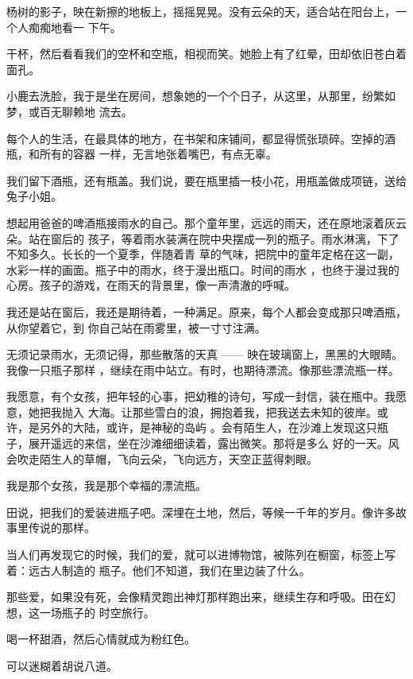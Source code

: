 \documentclass[12pt,a4paper]{article}
\begin{document}
		杨树的影子，映在新擦的地板上，摇摇晃晃。没有云朵的天，适合站在阳台上，一个人痴痴地看一
	下午。

		干杯，然后看看我们的空杯和空瓶，相视而笑。她脸上有了红晕，田却依旧苍白着面孔。

		小鹿去洗脸，我于是坐在房间，想象她的一个个日子，从这里，从那里，纷繁如梦，或百无聊赖地
	流去。

		每个人的生活，在最具体的地方，在书架和床铺间，都显得慌张琐碎。空掉的酒瓶，和所有的容器
	一样，无言地张着嘴巴，有点无辜。

		我们留下酒瓶，还有瓶盖。我们说，要在瓶里插一枝小花，用瓶盖做成项链，送给兔子小姐。

		想起用爸爸的啤酒瓶接雨水的自己。那个童年里，远远的雨天，还在原地滚着灰云朵。站在窗后的
	孩子，等着雨水装满在院中央摆成一列的瓶子。雨水淋漓，下了不知多久。长长的一个夏季，伴随着青
	草的气味，把院中的童年定格在这一副，水彩一样的画面。瓶子中的雨水，终于漫出瓶口。时间的雨水
	，也终于漫过我的心房。孩子的游戏，在雨天的背景里，像一声清澈的呼喊。

		我还是站在窗后，我还是期待着，一种满足。原来，每个人都会变成那只啤酒瓶，从你望着它，到
	你自己站在雨雾里，被一寸寸注满。

		无须记录雨水，无须记得，那些散落的天真 —— 映在玻璃窗上，黑黑的大眼睛。我像一只瓶子那样
	，继续在雨中站立。有时，也期待漂流。像那些漂流瓶一样。

		我愿意，有个女孩，把年轻的心事，把幼稚的诗句，写成一封信，装在瓶中。我愿意，她把我抛入
	大海。让那些雪白的浪，拥抱着我，把我送去未知的彼岸。或许，是另外的大陆，或许，是神秘的岛屿
	。会有陌生人，在沙滩上发现这只瓶子，展开遥远的来信，坐在沙滩细细读着，露出微笑。那将是多么
	好的一天。风会吹走陌生人的草帽，飞向云朵，飞向远方，天空正蓝得刺眼。

		我是那个女孩，我是那个幸福的漂流瓶。

		田说，把我们的爱装进瓶子吧。深埋在土地，然后，等候一千年的岁月。像许多故事里传说的那样。

		当人们再发现它的时候，我们的爱，就可以进博物馆，被陈列在橱窗，标签上写着：远古人制造的
	瓶子。他们不知道，我们在里边装了什么。

		那些爱，如果没有死，会像精灵跑出神灯那样跑出来，继续生存和呼吸。田在幻想，这一场瓶子的
	时空旅行。

		喝一杯甜酒，然后心情就成为粉红色。

		可以迷糊着胡说八道。

	\endwriting


\end{document}
